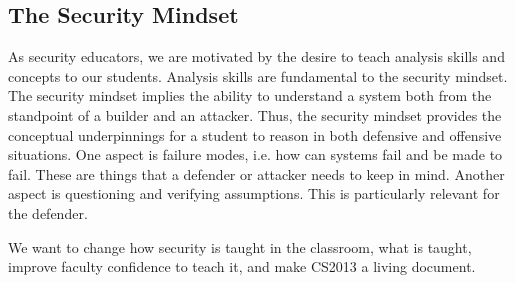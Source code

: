 \subsection{The Security Mindset}
As security educators, we are motivated by the desire to teach analysis skills and concepts
to our students.
Analysis skills are fundamental to the security mindset.  The security
mindset implies the ability to understand a system both from the
standpoint of a builder and an attacker.  Thus, the security mindset
provides the conceptual underpinnings for a student to reason in both
defensive and offensive situations.  One aspect is failure modes,
i.e. how can systems fail and be made to fail.  These are things that
a defender or attacker needs to keep in mind.  Another aspect is
questioning and verifying assumptions.  This is particularly relevant
for the defender.

We want to change how security is taught in the classroom, what is taught, improve 
faculty confidence to teach it, and make CS2013 a living document.
